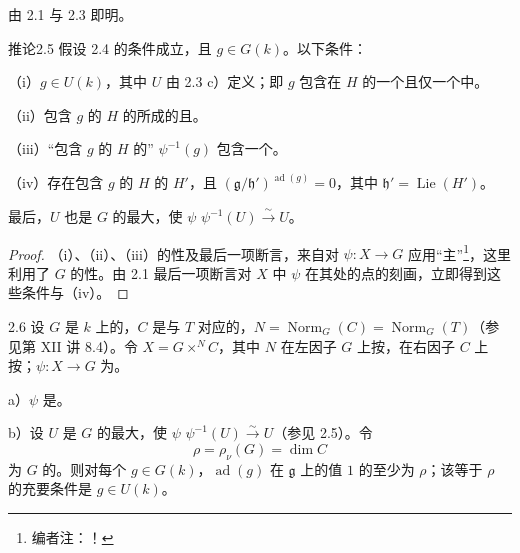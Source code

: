 由 2.1 与 2.3 即明。
\begin{SGAresult}{推论}{2.5}
假设 2.4 的条件成立，且 $g\in G(k)$。以下条件：

（i）$g\in U(k)$，其中 $U$ 由 2.3 c）定义；即 $g$ 包含在 $H$ 的一个且仅一个中。

（ii）包含 $g$ 的 $H$ 的所成的且。

（iii）“包含 $g$ 的 $H$ 的” $\psi^{-1}(g)$ 包含一个。

（iv）存在包含 $g$ 的 $H$ 的 $H'$，且 $(\mathfrak g/\mathfrak h')^{\operatorname{ad}(g)}=0$，其中 $\mathfrak h'=\operatorname{Lie}(H')$。

最后，$U$ 也是 $G$ 的最大，使 $\psi$  $\psi^{-1}(U)\xrightarrow{\sim}U$。
\end{SGAresult}
\begin{proof}
（i）、（ii）、（iii）的性及最后一项断言，来自对 $\psi:X\to G$ 应用“主”\footnote{编者注：！}，这里利用了 $G$ 的性。由 2.1 最后一项断言对 $X$ 中 $\psi$ 在其处的点的刻画，立即得到这些条件与（iv）。
\end{proof}
\begin{SGAresult}{}{2.6}
设 $G$ 是 $k$ 上的，$C$ 是与 $T$ 对应的，$N=\operatorname{Norm}_G(C)=\operatorname{Norm}_G(T)$（参见第 XII 讲 8.4）。令 $X=G\times^N C$，其中 $N$ 在左因子 $G$ 上按，在右因子 $C$ 上按；$\psi:X\to G$ 为。

 a）$\psi$ 是。

 b）设 $U$ 是 $G$ 的最大，使 $\psi$  $\psi^{-1}(U)\xrightarrow{\sim}U$（参见 2.5）。令
\[\rho=\rho_\nu(G)=\dim C\]
为 $G$ 的。则对每个 $g\in G(k)$，$\operatorname{ad}(g)$ 在 $\mathfrak g$ 上的值 $1$ 的至少为 $\rho$；该等于 $\rho$ 的充要条件是 $g\in U(k)$。
\end{SGAresult}
